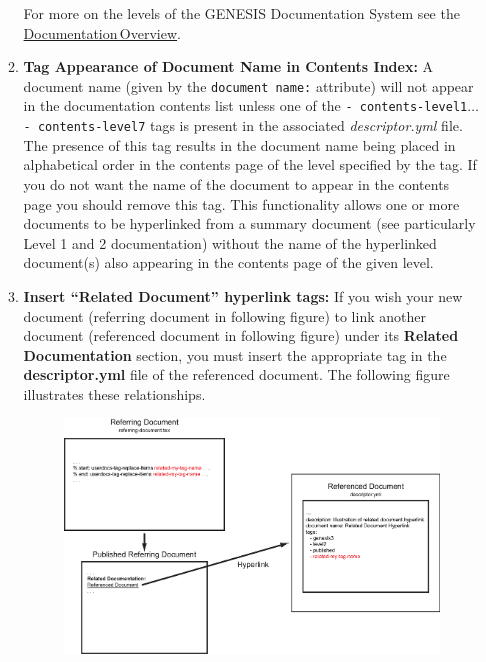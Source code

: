 \documentclass[12pt]{article}
\begin{document}
\begin{enumerate}
\begin{enumerate}
For more on the levels of the GENESIS Documentation System see the \href{../documentation-overview/documentation-overview.tex}{Documentation\,Overview}.

\item {\bf Tag Appearance of Document Name in Contents Index:} A document name (given by the {\tt document name:} attribute) will not appear in the documentation contents list unless one of the {\tt -\,contents-level1}$\ldots${\tt -\,contents-level7} tags is present in the associated {\it descriptor.yml} file. The presence of this tag results in the document name being placed in alphabetical order in the contents page of the level specified by the tag. If you do not want the name of the document to appear in the contents page you should remove this tag. This functionality allows one or more documents to be hyperlinked from a summary document (see particularly Level 1 and 2 documentation) without the name of the hyperlinked document(s) also appearing in the contents page of the given level.

\item {\bf Insert ``Related Document'' hyperlink tags:} If you wish your new document (referring document in following figure) to link another document (referenced document in following figure) under its {\bf Related Documentation} section, you must insert the appropriate tag in the {\bf descriptor.yml} file of the referenced document. The following figure illustrates these relationships.
\begin{figure}[h]
  \centering
   \includegraphics[scale=0.6]{figures/related-document.eps}
\end{figure}


\end{enumerate}
\end{enumerate}
\end{document}
